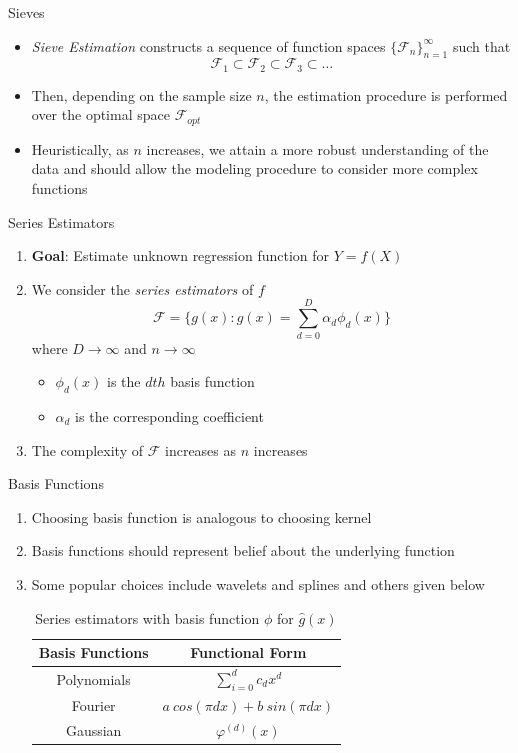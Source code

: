 \documentclass{beamer}
\begin{document}
\begin{frame}{Sieves}%
\begin{itemize}
\item \textit{Sieve Estimation} constructs a sequence of function spaces $\{\mathcal{F}_n\}_{n=1}^{\infty}$ such that $$\mathcal{F}_1\subset\mathcal{F}_2\subset\mathcal{F}_3\subset\ldots$$
\item Then, depending on the sample size $n$, the estimation procedure is performed over the optimal space $\mathcal{F}_{opt}$
\item Heuristically, as $n$ increases, we attain a more robust understanding of the data and should allow the modeling procedure to consider more complex functions
\end{itemize}
\end{frame}
\begin{frame}{Series Estimators}%

\begin{enumerate}
\item \textbf{Goal}: Estimate unknown regression function for $Y = f(X)$
\item We consider the \textit{series estimators} of $f$ $$ \mathcal{F} = \Big\{g(x): g(x) = \sum_{d=0}^{D} \alpha_{d} \phi_{d}(x)\Big\}$$  where $D\to\infty$ and $n\to\infty$ \pause
\begin{itemize}
  \item $\phi_d(x)$ is the $dth$ basis function
  \item $\alpha_d$ is the corresponding coefficient  
  \end{itemize}
\item The complexity of $\mathcal{F}$ increases as $n$ increases
\end{enumerate}
\end{frame}
\begin{frame}%
{Basis Functions}
\begin{enumerate}
\item Choosing basis function is analogous to choosing kernel 
\item Basis functions should represent belief about the underlying function 
\item Some popular choices include wavelets and splines and others given below 

\begin{table}[h]
\begin{center}
\begin{tabular}{|c|c|}
\hline
Basis Functions & Functional Form\\
\hline
Polynomials & $\sum_{i=0}^{d} c_d x^d$\\
Fourier &$a~cos(\pi d x) + b~sin(\pi d x)$\\
Gaussian &$\varphi^{(d)}(x)$\\
\hline
\end{tabular}
\caption{Series estimators with basis function $\phi$ for $\hat{g}(x)$}
\label{tab:basis}
\end{center}
\end{table}

\end{enumerate}
\end{frame}
\end{document}

